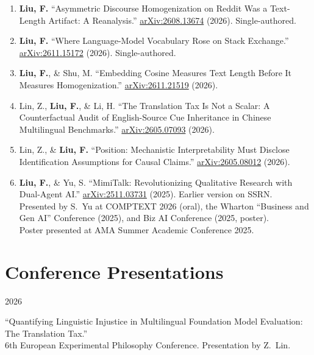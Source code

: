 \documentclass[11pt, a4paper]{article}
\newlength{\datelength}
\newlength{\contentlength}
\newcommand{\cventry}[2]{%
  \noindent
  \begin{minipage}[t]{\datelength}
    \raggedright #1
  \end{minipage}%
  \hspace{0.4cm}%
  \begin{minipage}[t]{\contentlength}
    \raggedright #2
  \end{minipage}%
  \par\vspace{6pt}%
}
\begin{document}
\begin{enumerate}[leftmargin=1.5em, itemsep=6pt]

  \item \textbf{Liu, F.}
  ``Asymmetric Discourse Homogenization on Reddit Was a Text-Length Artifact:
  A Reanalysis.''
  \href{https://arxiv.org/abs/2608.13674}{arXiv:2608.13674} (2026). Single-authored.

  \item \textbf{Liu, F.}
  ``Where Language-Model Vocabulary Rose on Stack Exchange.''
  \href{https://arxiv.org/abs/2611.15172}{arXiv:2611.15172} (2026). Single-authored.

  \item \textbf{Liu, F.}, \& Shu, M.
  ``Embedding Cosine Measures Text Length Before It Measures Homogenization.''
  \href{https://arxiv.org/abs/2611.21519}{arXiv:2611.21519} (2026).

  \item Lin, Z., \textbf{Liu, F.}, \& Li, H.
  ``The Translation Tax Is Not a Scalar: A Counterfactual Audit of
  English-Source Cue Inheritance in Chinese Multilingual Benchmarks.''
  \href{https://arxiv.org/abs/2605.07093}{arXiv:2605.07093} (2026).

  \item Lin, Z., \& \textbf{Liu, F.}
  ``Position: Mechanistic Interpretability Must Disclose Identification Assumptions
  for Causal Claims.''
  \href{https://arxiv.org/abs/2605.08012}{arXiv:2605.08012} (2026).

  \item \textbf{Liu, F.}, \& Yu, S.
  ``MimiTalk: Revolutionizing Qualitative Research with Dual-Agent AI.''
  \href{https://arxiv.org/abs/2511.03731}{arXiv:2511.03731} (2025). Earlier version on SSRN.\\
  Presented by S.\ Yu at COMPTEXT 2026 (oral), the Wharton ``Business and
  Gen AI'' Conference (2025), and Biz AI Conference (2025, poster).\\
  Poster presented at AMA Summer Academic Conference 2025.

\end{enumerate}

\section{Conference Presentations}

\cventry{2026}{%
  ``Quantifying Linguistic Injustice in Multilingual Foundation Model
  Evaluation: The Translation Tax.''\\
  6th European Experimental Philosophy Conference. Presentation by Z.\ Lin.}
\end{document}
